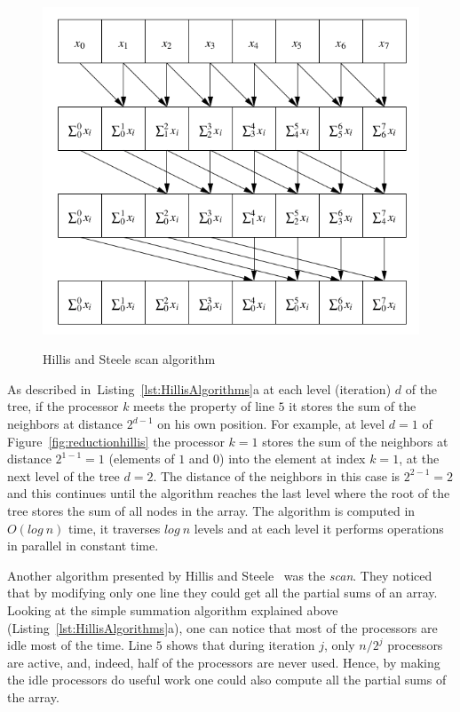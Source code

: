 \documentclass[Ingles]{ic-tese-v1}
\newcommand{\rfig}[1]{Figure~\ref{fig:#1}}
\newcommand{\tit}[1]{{\textit{#1}}}
\newcommand{\rlsts}[2]{Listing~\ref{lst:#1}{#2}}
\begin{document}
\begin{figure}[h]
	\centering
	\caption{Hillis and  Steele scan algorithm}
	\includegraphics[scale=0.5]{images/hillisscan.png}
	\label{fig:scanhillis}
\end{figure}

As described in~\rlsts{HillisAlgorithms}{a} at each level
(iteration) $d$ of the tree, if the processor $k$  meets the property of line $5$ it
stores the sum of the neighbors at distance $2^{d-1}$ on his own position.
For  example, at  level $d  = 1$  of \rfig{reductionhillis} the processor $k = 1$ stores the sum of the neighbors at distance $2^{1-1} = 1$ (elements of $1$ and $0$) into the element at index $k = 1$, at the  next level of  the tree $d = 2$. The distance of the
neighbors in this case is  $2^{2-1} = 2$ and this continues until the algorithm reaches the last level where the root of the tree stores the sum of all nodes in the array. The algorithm is computed in $O(log\ n)$ time, it traverses $log\ n$ levels and at each level it performs operations in parallel in constant time.

Another algorithm presented by Hillis and Steele~\cite{dataparallel} was the
\tit{scan}. They noticed that by modifying only one line they could get all the partial
sums of an array.  Looking at the simple summation algorithm explained
above (\rlsts{HillisAlgorithms}{a}), one can notice that most of the
processors are idle most of the time. Line $5$ shows that during iteration $j$,
only $n/2^{j}$ processors are active, and, indeed, half of the processors are
never used. Hence, by making the idle processors do useful work
one could also compute all the partial sums of the array.
\end{document}
